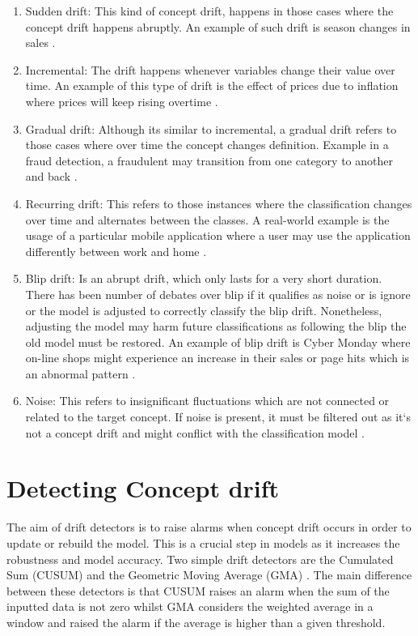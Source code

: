 	
   \begin{enumerate}
  \item	Sudden drift: This kind of concept drift, happens in those cases where the concept drift happens abruptly. An example of such drift is season changes in sales \citep{Tsymbal04theproblem}.
  \item Incremental: The drift happens whenever variables change their value over time. An example of this type of drift is the effect of prices due to inflation where prices will keep rising overtime \citep{Tsymbal04theproblem}. 
  \item Gradual drift: Although its similar to incremental, a gradual drift refers to those cases where over time the concept changes definition. Example in a fraud detection, a fraudulent may transition from one category to another and back \citep{Tsymbal04theproblem}.
  \item	Recurring drift: This refers to those instances where the classification changes over time and alternates between the classes. A real-world example is the usage of a particular mobile application where a user may use the application differently between work and home \citep{Tsymbal04theproblem}. 
  \item	Blip drift: Is an abrupt drift, which only lasts for a very short duration. There has been number of debates over blip if it qualifies as noise or is ignore or the model is adjusted to correctly classify the blip drift. Nonetheless, adjusting the model may harm future classifications as following the blip the old model must be restored. An example of blip drift is Cyber Monday where on-line shops might experience an increase in their sales or page hits which is an abnormal pattern \citep{Tsymbal04theproblem}.
  \item Noise: This refers to insignificant fluctuations which are not connected or related to the target concept. If noise is present, it must be filtered out as it`s not a concept drift and might conflict with the classification model \citep{Tsymbal04theproblem}. 
\end{enumerate}

\section{Detecting Concept drift}

The aim of drift detectors is to raise alarms when concept drift occurs in order to update or rebuild the model. This is a crucial step in models as it increases the robustness and model accuracy.  Two simple drift detectors are the Cumulated Sum (CUSUM) \citep{ROSS2012191} and the Geometric Moving Average (GMA) \citep{ROSS2012191}. The main difference between these detectors is that CUSUM raises an alarm when the sum of the inputted data is not zero whilst GMA considers the weighted average in a window and raised the alarm if the average is higher than a given threshold. 

